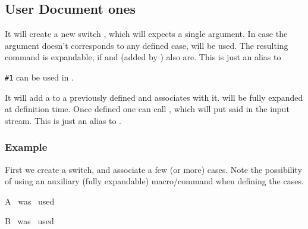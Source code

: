 \documentclass[10pt]{article}
\begin{document}
\subsection{User Document ones}
\begin{codedescribe}{\mkswitch}
\begin{codesyntax}%
\tsobj{\mkswitch}  
\end{codesyntax}
It will create a new switch , which will expects a single argument. In case the argument doesn't corresponds to any defined case,  will be used. The resulting  command is expandable, if  and  (added by \tsobj{\addcase}) also are. This is just an alias to 
\end{codedescribe}
\begin{tsremark}
  \verb|#1| can be used in .
\end{tsremark}

\begin{codedescribe}{\addcase}
\begin{codesyntax}%
\tsobj{\addcase}  
\end{codesyntax}
It will add a  to a previously defined  and associates  with it.  will be fully expanded at definition time. Once defined one can call , which will put said  in the input stream.   This is just an alias to .
\end{codedescribe}

\subsubsection{Example}

First we create a switch, and associate a few (or more) cases. Note the possibility of using an auxiliary (fully expandable) macro/command when defining the cases.
\begin{codestore}[switch02]
\def\CaseAstring{case-A}
\mkswitch {}
\addcase  \myCase  {\CaseAstring} {A~ was~ used\par}
\addcase  {} {B~ was~ used\par}
\end{codestore}
\end{document}
